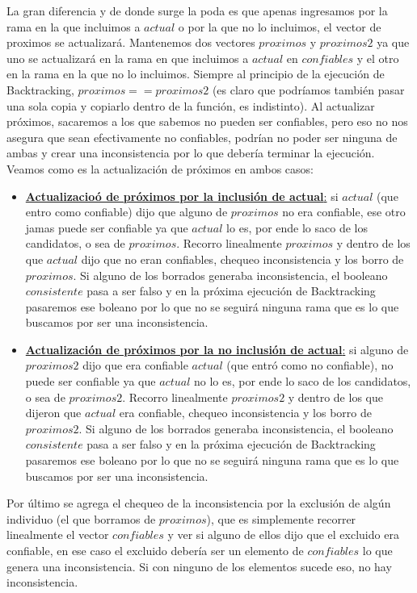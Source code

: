 \documentclass[A4paper,oneside,fleqn,10pt]{article}
\theoremstyle{definition}
\begin{document}
La gran diferencia y de donde surge la poda es que apenas ingresamos por la rama en la que incluimos a $actual$ o por la que no lo incluimos, el vector de proximos se actualizará. Mantenemos dos vectores $proximos$ y $proximos2$ ya que uno se actualizará en la rama en que incluimos a $actual$ en $confiables$ y el otro en la rama en la que no lo incluimos. Siempre al principio de la ejecución de Backtracking, $proximos==proximos2$ (es claro que podríamos también pasar una sola copia y copiarlo dentro de la función, es indistinto). Al actualizar próximos, sacaremos a los que sabemos no pueden ser confiables, pero eso no nos asegura que sean efectivamente no confiables, podrían no poder ser ninguna de ambas y crear una inconsistencia por lo que debería terminar la ejecución. Veamos como es la actualización de próximos en ambos casos: 

\begin{itemize}

 
\item  \underline{\textbf{Actualizacioó de próximos por la inclusión de actual}:} si $actual$ (que entro como confiable) dijo que alguno de $proximos$ no era confiable, ese otro jamas puede ser confiable ya que $actual $ lo es, por ende lo saco de los candidatos, o sea de $proximos$. Recorro linealmente $proximos$ y dentro de los que $actual$ dijo que no eran confiables, chequeo inconsistencia y los borro de $proximos$. Si alguno de los borrados generaba inconsistencia, el booleano $consistente$ pasa a ser falso y en la próxima ejecución de Backtracking pasaremos ese boleano por lo que no se seguirá ninguna rama que es lo que buscamos por ser una inconsistencia.

\item \underline{\textbf{Actualización de próximos por la no inclusión de actual}:} si alguno de  $proximos2$ dijo que era confiable $actual$ (que entró como no confiable), no puede ser confiable ya que $actual$ no lo es, por ende lo saco de los candidatos, o sea de $proximos2$. Recorro linealmente $proximos2$ y dentro de los que dijeron que $actual$ era confiable, chequeo inconsistencia y los borro de $proximos2$. Si alguno de los borrados generaba inconsistencia, el booleano $consistente$ pasa a ser falso y en la próxima ejecución de Backtracking pasaremos ese boleano por lo que no se seguirá ninguna rama que es lo que buscamos por ser una inconsistencia.

\end{itemize}

Por último se agrega el chequeo de la inconsistencia por la exclusión de algún individuo (el que borramos de $proximos$), que es simplemente recorrer linealmente el vector $confiables$ y ver si alguno de ellos dijo que el excluido era confiable, en ese caso el excluido debería ser un elemento de $confiables$ lo que genera una inconsistencia. Si con ninguno de los elementos sucede eso, no hay inconsistencia.
\end{document}

